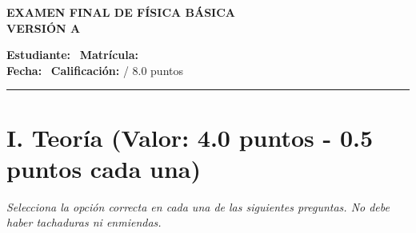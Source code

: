 \documentclass[11pt,a4paper]{article}
\begin{document}
\begin{center}
    \textbf{\Large EXAMEN FINAL DE FÍSICA BÁSICA} \\[0.2cm]
    \textbf{\large VERSIÓN A} \\[0.4cm]
\end{center}

\noindent \textbf{Estudiante:} \hrulefill \ \textbf{Matrícula:} \underline{\hspace{3cm}} \\[0.2cm]
\textbf{Fecha:} \underline{\hspace{4cm}} \ \textbf{Calificación:} \underline{\hspace{1.5cm}} / 8.0 puntos \\

\hrule
\section*{I. Teoría (Valor: 4.0 puntos - 0.5 puntos cada una)}
\textit{Selecciona la opción correcta en cada una de las siguientes preguntas. No debe haber tachaduras ni enmiendas.}
\end{document}
